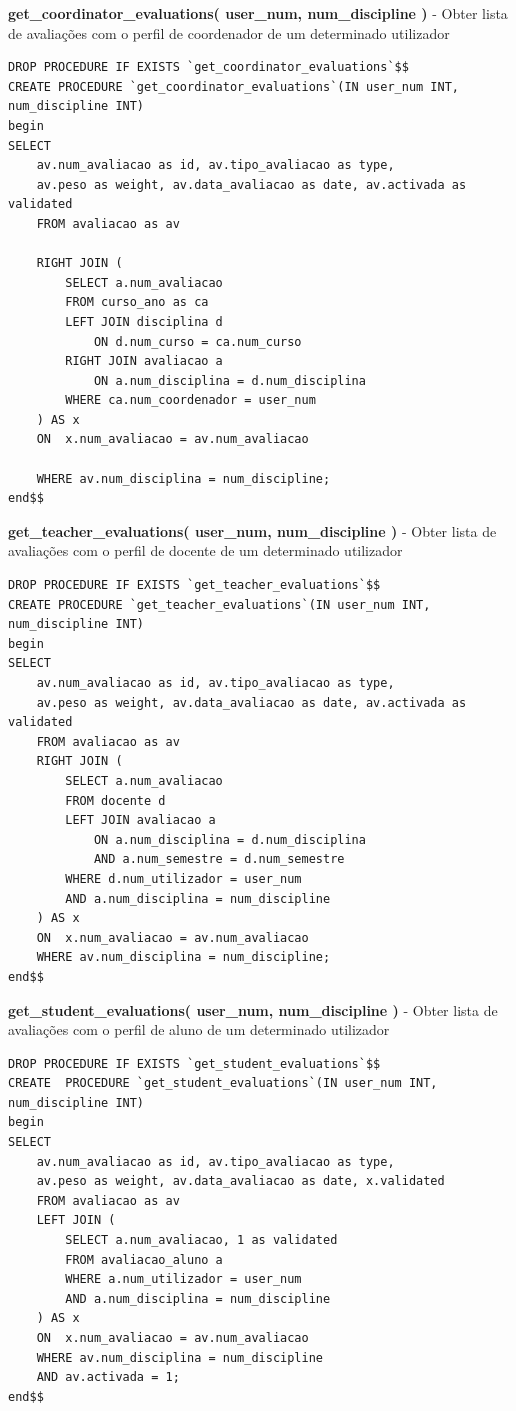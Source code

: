 \begin{list}{\textbf{-}}{\textbf{STORED PROCEDURES}}
\item \textbf{get\_coordinator\_evaluations( user\_num, num\_discipline )} - Obter lista de avaliações com o perfil de coordenador de um determinado utilizador
\begin{lstlisting}
DROP PROCEDURE IF EXISTS `get_coordinator_evaluations`$$
CREATE PROCEDURE `get_coordinator_evaluations`(IN user_num INT, num_discipline INT)
begin
SELECT 
	av.num_avaliacao as id, av.tipo_avaliacao as type, 
	av.peso as weight, av.data_avaliacao as date, av.activada as validated
	FROM avaliacao as av
	
	RIGHT JOIN (
		SELECT a.num_avaliacao	
		FROM curso_ano as ca
		LEFT JOIN disciplina d
			ON d.num_curso = ca.num_curso
		RIGHT JOIN avaliacao a
			ON a.num_disciplina = d.num_disciplina
		WHERE ca.num_coordenador = user_num
	) AS x 
	ON  x.num_avaliacao = av.num_avaliacao

	WHERE av.num_disciplina = num_discipline;
end$$
\end{lstlisting}

\item \textbf{get\_teacher\_evaluations( user\_num, num\_discipline )} - Obter lista de avaliações com o perfil de docente de um determinado utilizador
\begin{lstlisting}
DROP PROCEDURE IF EXISTS `get_teacher_evaluations`$$
CREATE PROCEDURE `get_teacher_evaluations`(IN user_num INT, num_discipline INT)
begin
SELECT 
	av.num_avaliacao as id, av.tipo_avaliacao as type, 
	av.peso as weight, av.data_avaliacao as date, av.activada as validated
	FROM avaliacao as av
	RIGHT JOIN (
		SELECT a.num_avaliacao
		FROM docente d
		LEFT JOIN avaliacao a
			ON a.num_disciplina = d.num_disciplina
			AND a.num_semestre = d.num_semestre
		WHERE d.num_utilizador = user_num
		AND a.num_disciplina = num_discipline
	) AS x 
	ON  x.num_avaliacao = av.num_avaliacao
	WHERE av.num_disciplina = num_discipline;
end$$
\end{lstlisting}

\item \textbf{get\_student\_evaluations( user\_num, num\_discipline )} - Obter lista de avaliações com o perfil de aluno de um determinado utilizador
\begin{lstlisting}
DROP PROCEDURE IF EXISTS `get_student_evaluations`$$
CREATE  PROCEDURE `get_student_evaluations`(IN user_num INT, num_discipline INT)
begin
SELECT 
	av.num_avaliacao as id, av.tipo_avaliacao as type, 
	av.peso as weight, av.data_avaliacao as date, x.validated
	FROM avaliacao as av
	LEFT JOIN (
		SELECT a.num_avaliacao, 1 as validated	
		FROM avaliacao_aluno a
		WHERE a.num_utilizador = user_num
		AND a.num_disciplina = num_discipline
	) AS x 
	ON  x.num_avaliacao = av.num_avaliacao
	WHERE av.num_disciplina = num_discipline
	AND av.activada = 1;
end$$
\end{lstlisting}


\end{list}
